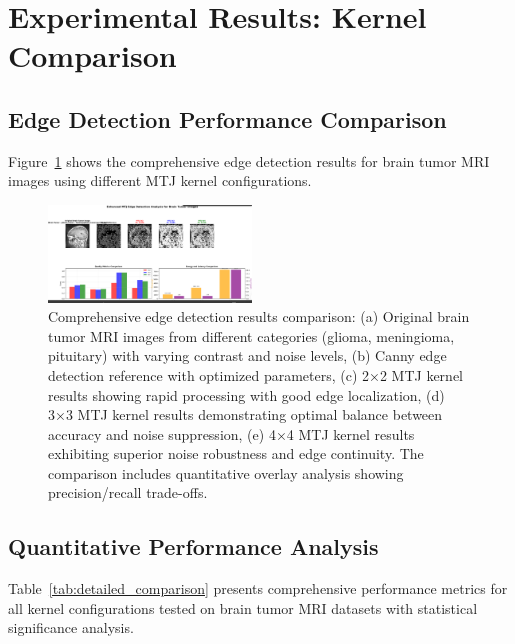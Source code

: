 \documentclass[conference]{IEEEtran}
\begin{document}
{{\section{Experimental Results: Kernel Comparison}

\subsection{Edge Detection Performance Comparison}

Figure~\ref{fig:kernel_results} shows the comprehensive edge detection results for brain tumor MRI images using different MTJ kernel configurations.

\begin{figure}[htbp]
\centerline{\includegraphics[width=0.48\textwidth]{Screenshot 2025-07-12 123903.png}}
\caption{Comprehensive edge detection results comparison: (a) Original brain tumor MRI images from different categories (glioma, meningioma, pituitary) with varying contrast and noise levels, (b) Canny edge detection reference with optimized parameters, (c) 2×2 MTJ kernel results showing rapid processing with good edge localization, (d) 3×3 MTJ kernel results demonstrating optimal balance between accuracy and noise suppression, (e) 4×4 MTJ kernel results exhibiting superior noise robustness and edge continuity. The comparison includes quantitative overlay analysis showing precision/recall trade-offs.}
\label{fig:kernel_results}
\end{figure}

\subsection{Quantitative Performance Analysis}

Table~\ref{tab:detailed_comparison} presents comprehensive performance metrics for all kernel configurations tested on brain tumor MRI datasets with statistical significance analysis.

}}
\end{document}
